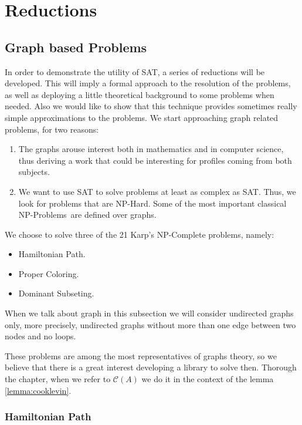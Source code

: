 \section{Reductions}
\subsection{Graph based Problems}
In order to demonstrate the utility of SAT, a series of reductions will be developed. This will imply a formal approach to the resolution of the problems, as well as deploying a little theoretical background to some problems when needed. Also we would like to show that this technique provides sometimes really simple approximations to the problems. We start approaching graph related problems, for two reasons:

\begin{enumerate}
\item The graphs arouse interest both in mathematics and in computer science, thus deriving a work that could be interesting for profiles coming from both subjects.
\item We want to use SAT to solve problems at least as complex as SAT. Thus, we look for problems that are NP-Hard. Some of the most important classical NP-Problems\ are defined over graphs. 
\end{enumerate}
 
We choose to solve three of the 21 Karp's NP-Complete problems\cite{karp1972reducibility}, namely:
\begin{itemize}
\item Hamiltonian Path.
\item Proper Coloring.
\item Dominant Subseting.
\end{itemize}

When we talk about graph in this subsection we will consider undirected graphs only, more precisely, undirected graphs without more than one edge between two nodes and no loops.

These problems are among the most representatives of graphs theory, so we believe that there is a great interest developing a library to solve then. Thorough the chapter, when we refer to $\mathcal{C}(A)$ we do it in the context of the lemma \ref{lemma:cooklevin}.


\subsubsection{Hamiltonian Path}

